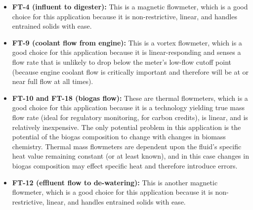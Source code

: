 
\begin{itemize}
\item{} {\bf FT-4 (influent to digester):} This is a magnetic flowmeter, which is a good choice for this application because it is non-restrictive, linear, and handles entrained solids with ease.
\vskip 20pt
\item{} {\bf FT-9 (coolant flow from engine):} This is a vortex flowmeter, which is a good choice for this application because it is linear-responding and senses a flow rate that is unlikely to drop below the meter's low-flow cutoff point (because engine coolant flow is critically important and therefore will be at or near full flow at all times).
\vskip 20pt
\item{} {\bf FT-10 and FT-18 (biogas flow):} These are thermal flowmeters, which is a good choice for this application because it is a technology yielding true mass flow rate (ideal for regulatory monitoring, for carbon credits), is linear, and is relatively inexpensive.  The only potential problem in this application is the potential of the biogas composition to change with changes in biomass chemistry.  Thermal mass flowmeters are dependent upon the fluid's specific heat value remaining constant (or at least known), and in this case changes in biogas composition may effect specific heat and therefore introduce errors.
\vskip 20pt
\item{} {\bf FT-12 (effluent flow to de-watering):} This is another magnetic flowmeter, which is a good choice for this application because it is non-restrictive, linear, and handles entrained solids with ease.
\end{itemize}











